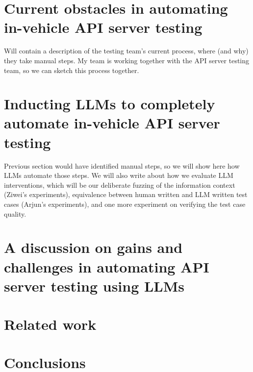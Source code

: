 \section{Current obstacles in automating in-vehicle API server testing}

Will contain a description of the testing team's current process, where (and why) they take manual steps. My team is working together with the API server testing team, so we can sketch this process together.

\section{Inducting LLMs to completely automate in-vehicle API server testing}

Previous section would have identified manual steps, so we will show here how LLMs automate those steps. We will also write about how we evaluate LLM interventions, which will be our deliberate fuzzing of the information context (Ziwei's experiments), equivalence between human written and LLM written test cases (Arjun's experiments), and one more experiment on verifying the test case quality.

\section{A discussion on gains and challenges in automating API server testing using LLMs}

\section{Related work}

\section{Conclusions}
